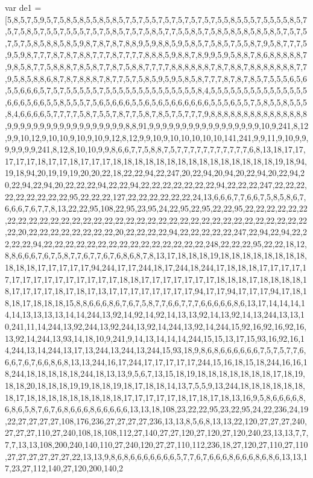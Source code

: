 var de1 = [5,8,5,7,5,9,5,7,5,8,5,8,5,5,8,5,8,5,7,5,7,5,5,7,5,7,5,7,5,7,5,7,5,5,8,5,5,5,7,5,5,5,5,8,5,7,5,7,5,8,5,7,5,5,7,5,5,5,7,5,7,5,8,5,7,5,7,5,8,5,7,7,5,5,8,5,7,5,8,5,8,5,8,5,8,5,8,5,7,5,7,5,7,5,7,5,8,5,8,8,5,8,5,9,8,7,8,7,8,7,8,8,9,5,9,8,8,5,9,5,8,5,7,5,8,5,7,5,5,8,7,9,5,8,7,7,7,5,9,5,9,8,7,7,7,8,7,8,7,8,8,7,7,7,8,7,7,7,7,8,8,8,5,9,8,8,7,8,9,9,5,9,5,8,8,7,8,6,8,8,8,8,8,7,9,8,5,8,7,7,5,8,8,8,7,8,5,8,7,7,8,7,5,8,8,7,7,7,7,8,8,8,8,8,8,7,8,7,8,8,7,8,8,8,8,8,8,8,7,7,9,5,8,5,8,8,6,8,7,8,7,8,8,8,7,8,7,7,5,7,5,8,5,9,5,9,5,8,5,8,7,7,7,8,7,8,7,8,5,7,5,5,5,6,5,6,5,5,6,6,6,5,7,5,7,5,5,5,5,5,7,5,5,5,5,5,5,5,5,5,5,5,5,5,5,8,4,5,5,5,5,5,5,5,5,5,5,5,5,5,5,5,6,6,6,5,6,6,5,5,8,5,5,5,7,5,6,5,6,6,6,5,5,6,5,6,5,6,6,6,6,6,6,5,5,5,6,5,5,7,5,8,5,5,8,5,5,5,8,4,6,6,6,6,5,7,7,7,7,5,8,7,5,5,7,8,7,7,5,8,7,8,5,7,5,7,7,7,9,8,8,8,8,8,8,8,8,8,8,8,8,8,8,8,9,9,9,9,9,9,9,9,9,9,9,9,9,9,9,9,9,9,8,8,91,9,9,9,9,9,9,9,9,9,9,9,9,9,9,9,9,9,10,9,241,8,12,9,9,10,12,9,10,10,9,10,9,10,9,12,8,12,9,9,10,9,10,10,10,10,10,141,241,9,9,11,9,10,9,9,9,9,9,9,9,241,8,12,8,10,10,9,9,8,6,6,7,7,5,8,8,7,5,7,7,7,7,7,7,7,7,7,7,7,6,8,13,18,17,17,17,17,17,18,17,17,18,17,17,17,18,18,18,18,18,18,18,18,18,18,18,18,18,18,18,19,18,94,19,18,94,20,19,19,19,20,20,22,18,22,22,94,22,247,20,22,94,20,94,20,22,94,20,22,94,20,22,94,22,94,20,22,22,22,94,22,22,94,22,22,22,22,22,22,22,94,22,22,22,247,22,22,22,22,22,22,22,22,22,95,22,22,22,127,22,22,22,22,22,22,24,13,6,6,6,7,7,6,6,7,5,8,5,8,6,7,6,6,6,7,6,7,7,8,13,22,22,95,108,22,95,23,95,24,22,95,22,95,22,22,95,22,22,22,22,22,22,22,22,22,22,22,22,22,22,22,22,22,22,22,22,22,22,22,22,22,22,22,22,22,22,22,22,22,22,22,20,22,22,22,22,22,22,22,22,20,22,22,22,22,94,22,22,22,22,22,247,22,94,22,94,22,22,22,22,94,22,22,22,22,22,22,22,22,22,22,22,22,22,22,22,248,22,22,22,95,22,22,18,12,8,8,6,6,6,7,6,7,5,8,7,7,6,7,7,6,7,6,8,6,8,7,8,13,17,18,18,18,19,18,18,18,18,18,18,18,18,18,18,18,17,17,17,17,17,94,244,17,17,244,18,17,244,18,244,17,18,18,18,17,17,17,17,17,17,17,17,17,17,17,17,17,17,17,18,18,17,17,17,17,17,17,17,18,18,18,17,18,18,18,18,18,17,17,17,17,18,17,18,17,13,17,17,17,17,17,17,17,17,94,17,17,94,17,17,17,94,17,18,18,18,17,18,18,18,15,8,8,6,6,6,8,6,7,6,7,5,8,7,7,6,6,7,7,7,6,6,6,6,6,8,6,13,17,14,14,14,14,14,13,13,13,13,14,14,244,13,92,14,92,14,92,14,13,13,92,14,13,92,14,13,244,13,13,10,241,11,14,244,13,92,244,13,92,244,13,92,14,244,13,92,14,244,15,92,16,92,16,92,16,13,92,14,244,13,93,14,18,10,9,241,9,14,13,14,14,14,244,15,15,13,17,15,93,16,92,16,14,244,13,14,244,13,17,13,244,13,244,13,244,15,93,18,9,8,6,8,6,6,6,6,6,6,7,5,7,5,7,7,6,6,6,7,6,7,6,6,8,6,8,13,13,244,16,17,244,17,17,17,17,17,244,15,16,18,15,18,244,16,16,18,244,18,18,18,18,18,244,18,13,13,9,5,6,7,13,15,18,19,18,18,18,18,18,18,18,17,18,19,18,18,20,18,18,18,19,19,18,18,19,18,17,18,18,14,13,7,5,5,9,13,244,18,18,18,18,18,18,18,17,18,18,18,18,18,18,18,18,18,17,17,17,17,17,18,17,18,17,18,13,16,9,5,8,6,6,6,6,8,6,8,6,5,8,7,6,7,6,8,6,6,6,8,6,6,6,6,6,13,13,18,108,23,22,22,95,23,22,95,24,22,236,24,19,22,27,27,27,27,108,176,236,27,27,27,27,236,13,13,8,5,6,8,13,13,22,120,27,27,27,240,27,27,27,110,27,240,108,18,108,112,27,140,27,27,120,27,120,27,120,240,23,13,13,7,7,7,7,13,13,108,200,240,140,110,27,240,120,27,27,110,112,236,18,27,120,27,110,27,110,27,27,27,27,27,27,22,13,13,9,8,6,8,6,6,6,6,6,6,6,5,7,7,6,7,6,6,6,8,6,6,6,8,6,8,6,13,13,17,23,27,112,140,27,120,200,140,2